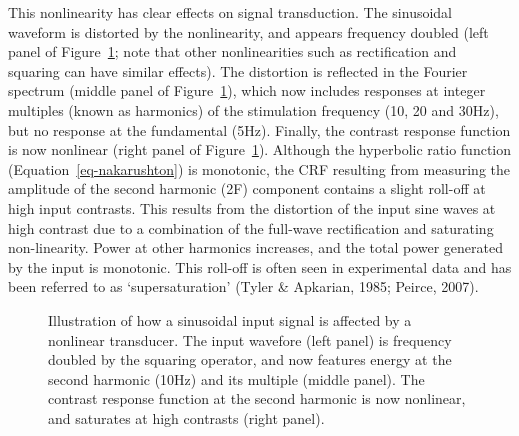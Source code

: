 \documentclass[
  letterpaper,
  DIV=11,
  numbers=noendperiod]{scrartcl}
\begin{document}
This nonlinearity has clear effects on signal transduction. The
sinusoidal waveform is distorted by the nonlinearity, and appears
frequency doubled (left panel of Figure~\ref{fig-transducer}; note that
other nonlinearities such as rectification and squaring can have similar
effects). The distortion is reflected in the Fourier spectrum (middle
panel of Figure~\ref{fig-transducer}), which now includes responses at
integer multiples (known as harmonics) of the stimulation frequency (10,
20 and 30Hz), but no response at the fundamental (5Hz). Finally, the
contrast response function is now nonlinear (right panel of
Figure~\ref{fig-transducer}). Although the hyperbolic ratio function
(Equation~\ref{eq-nakarushton}) is monotonic, the CRF resulting from
measuring the amplitude of the second harmonic (2F) component contains a
slight roll-off at high input contrasts. This results from the
distortion of the input sine waves at high contrast due to a combination
of the full-wave rectification and saturating non-linearity. Power at
other harmonics increases, and the total power generated by the input is
monotonic. This roll-off is often seen in experimental data and has been
referred to as `supersaturation' (Tyler \& Apkarian, 1985; Peirce,
2007).

\begin{figure}


\caption{\label{fig-transducer}Illustration of how a sinusoidal input
signal is affected by a nonlinear transducer. The input wavefore (left
panel) is frequency doubled by the squaring operator, and now features
energy at the second harmonic (10Hz) and its multiple (middle panel).
The contrast response function at the second harmonic is now nonlinear,
and saturates at high contrasts (right panel).}

\end{figure}%
\end{document}
